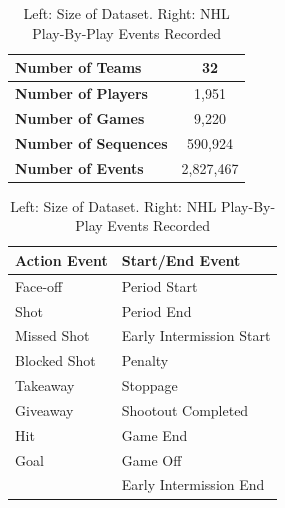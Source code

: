 \documentclass[runningheads,a4paper]{llncs}
\begin{document}
\begin{table}[htb]
\caption{Left: Size of Dataset. Right: NHL Play-By-Play Events Recorded}
\label{table:size-of-dataset}
\begin{center}
\begin{tabular}{|l|c|}
\hline
\bf{Number of Teams} & 32 \\ \hline
\bf{Number of Players} & 1,951 \\ \hline
\bf{Number of Games} & 9,220 \\ \hline
\bf{Number of Sequences} & 590,924 \\ \hline
\bf{Number of Events} & 2,827,467 \\ \hline
\end{tabular}
\quad
\begin{tabular}{|l|l|}
\hline
 \bf{Action Event} & \bf{Start/End Event}\\ \hline
Face-off & Period Start \\\hline
Shot & Period End \\\hline
Missed Shot & Early Intermission Start\\ \hline
Blocked Shot & Penalty\\ \hline
Takeaway & Stoppage\\  \hline
Giveaway & Shootout Completed\\ \hline
Hit & Game End\\ \hline
Goal & Game Off\\ \hline
& Early Intermission End \\
\hline
\end{tabular}
\end{center}
\end{table}

\end{document}
